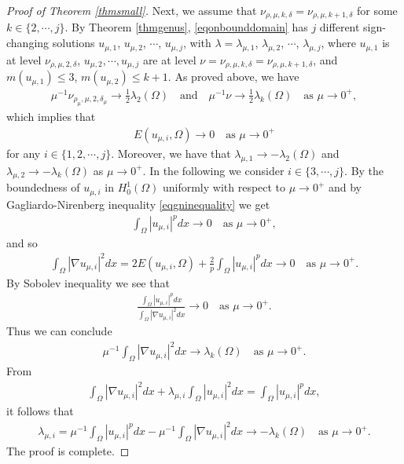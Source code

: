 \documentclass[10pt,a4paper]{amsart}
\newcommand{\la}{\lambda}
\begin{document}
\begin{proof}[Proof of Theorem \ref{thmsmall}]
Next, we assume that $\nu_{\rho,\mu,k,\delta} = \nu_{\rho,\mu,k+1,\delta}$ for some $k \in \{2,\cdots,j\}$. By Theorem \ref{thmgenus}, \eqref{eqonbounddomain} has $j$ different sign-changing solutions $u_{\mu,1}$, $u_{\mu,2}$, $\cdots$, $u_{\mu,j}$, with $\la = \la_{\mu,1}$, $\la_{\mu,2}$, $\cdots$, $\la_{\mu,j}$, where $u_{\mu,1}$ is at level $\nu_{\rho,\mu,2,\delta}$, $u_{\mu,2}, \cdots, u_{\mu,j}$ are at level $\nu = \nu_{\rho,\mu,k,\delta} = \nu_{\rho,\mu,k+1,\delta}$, and $m(u_{\mu,1}) \le 3$, $m(u_{\mu,2}) \le k+1$. As proved above, we have
\begin{align*}
	\mu^{-1}\nu_{\rho_\mu,\mu,2,\delta_\mu} \to \frac12\la_2(\Omega) \quad \text{and} \quad \mu^{-1}\nu \to \frac12\la_{k}(\Omega) \quad \text{as } \mu \to 0^+,
\end{align*}
which implies that
\begin{align*}
	E(u_{\mu,i},\Omega) \to 0 \quad \text{as } \mu \to 0^+
\end{align*}
for any $i \in \{1,2,\cdots,j\}$. Moreover, we have that $\la_{\mu,1} \to -\la_2(\Omega)$ and $\la_{\mu,2} \to -\la_k(\Omega)$ as $\mu \to 0^+$. In the following we consider $i \in \{3,\cdots,j\}$. By the boundedness of $u_{\mu,i}$ in $H_0^1(\Omega)$ uniformly with respect to $\mu \to 0^+$ and by Gagliardo-Nirenberg inequality \eqref{eqgninequality} we get
\begin{align*}
	\int_\Omega|u_{\mu,i}|^pdx \to 0 \quad \text{as } \mu \to 0^+,
\end{align*}
and so
\begin{align*}
	\int_\Omega |\nabla u_{\mu,i}|^2dx = 2E(u_{\mu,i},\Omega) + \frac2p\int_\Omega |u_{\mu,i}|^pdx \to 0 \quad \text{as } \mu \to 0^+.
\end{align*}
By Sobolev inequality we see that
\begin{align*}
	\frac{\int_\Omega |u_{\mu,i}|^pdx}{\int_\Omega |\nabla u_{\mu,i}|^2dx} \to 0 \quad \text{as } \mu \to 0^+.
\end{align*}
Thus we can conclude
\begin{align*}
	\mu^{-1}\int_\Omega|\nabla u_{\mu,i}|^2dx \to \la_k(\Omega) \quad \text{as } \mu \to 0^+.
\end{align*}
From
\begin{align*}
	\int_\Omega |\nabla u_{\mu,i}|^2 dx + \la_{\mu,i} \int_\Omega |u_{\mu,i}|^2dx = \int_\Omega |u_{\mu,i}|^p dx,
\end{align*}
it follows that
\begin{align*}
	\la_{\mu,i} = \mu^{-1}\int_\Omega |u_{\mu,i}|^p dx - \mu^{-1}\int_\Omega |\nabla u_{\mu,i}|^2 dx \to -\la_k(\Omega) \quad \text{as } \mu \to 0^+.
\end{align*}
The proof is complete.
\end{proof}
\end{document}
